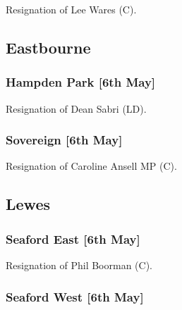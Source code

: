 \documentclass[a4paper,openany]{book}
\begin{document}
\begin{resultsiii}

Resignation of Lee Wares (C).

\subsection*{Eastbourne}

\subsubsection*{Hampden Park \hspace*{\fill}\nolinebreak[1]%
	\enspace\hspace*{\fill}
	[6th May]}


Resignation of Dean Sabri (LD).

\subsubsection*{Sovereign \hspace*{\fill}\nolinebreak[1]%
	\enspace\hspace*{\fill}
	[6th May]}


Resignation of Caroline Ansell MP (C).

\subsection*{Lewes}

\subsubsection*{Seaford East \hspace*{\fill}\nolinebreak[1]%
	\enspace\hspace*{\fill}
	[6th May]}


Resignation of Phil Boorman (C).

\subsubsection*{Seaford West \hspace*{\fill}\nolinebreak[1]%
	\enspace\hspace*{\fill}
	[6th May]}


\end{resultsiii}
\end{document}
